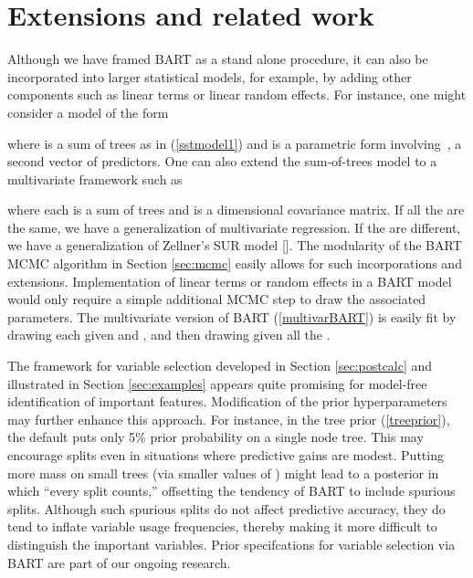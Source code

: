 \documentclass[aoas,nameyear,dvips]{arximspdf}
\begin{document}
\section{Extensions and related work}\label{sec:related}

Although we have framed BART as a stand alone procedure, it can
also be incorporated into larger statistical models, for example,
by adding other components such as linear terms or linear random
effects.  For instance,
one might consider a model of the form

where  is a sum of trees as in (\ref{sstmodel1}) and  is a parametric form involving~, a second vector of predictors.
One can also extend the sum-of-trees model to a
multivariate framework such as

where each  is a sum of trees and  is a  dimensional
covariance matrix.  If all the  are the same, we have a
generalization of multivariate regression. If the  are
different, we have a generalization of Zellner's SUR model
[\citet{Zell1962}].  The modularity of the BART MCMC algorithm in
Section \ref{sec:mcmc} easily allows for such incorporations and
extensions.  Implementation of linear terms or random effects in a
BART model would only require a simple additional MCMC step to draw
the associated parameters. The multivariate version of BART
(\ref{multivarBART}) is easily fit by drawing each  given
 and , and then drawing  given
all the .


The framework for variable selection developed in Section
\ref{sec:postcalc} and illustrated in Section \ref{sec:examples}
appears quite promising for model-free identification of important
features.   Modification of the prior hyperparameters may further
enhance this approach.  For instance, in the tree prior
(\ref{treeprior}), the default  puts only 5\% prior
probability on a single node tree.  This may encourage splits even in
situations where predictive gains are modest.  Putting more mass on
small trees (via smaller values of ) might lead to a posterior
in which ``every split counts,'' offsetting the tendency of BART to
include spurious splits.  Although such spurious splits do not affect
predictive accuracy, they do tend to inflate variable usage
frequencies, thereby making it more difficult to distinguish the
important variables.  Prior specifcations for variable selection via
BART are part of our ongoing research.
\end{document}
